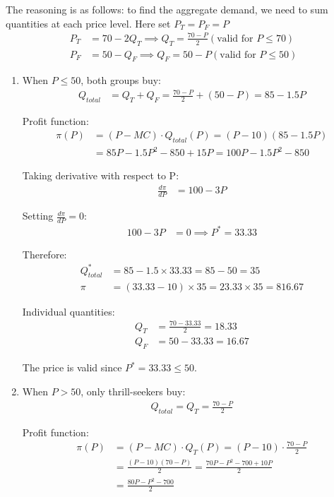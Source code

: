 \documentclass[12pt]{article}
\begin{document}
\begin{enumerate}[label=(\alph*)]
The reasoning is as follows: to find the aggregate demand, we need to sum quantities at each price level. Here set $P_T = P_F = P$
\begin{align*}
P_T &= 70 - 2Q_T \implies Q_T = \frac{70 - P}{2} (\text{valid for } P \leq 70)\\
P_F &= 50 - Q_F \implies Q_F = 50 - P (\text{valid for } P \leq 50)
\end{align*}

\begin{enumerate} [label= (\roman*)]

\item When $P \leq 50$, both groups buy:
\begin{align*}
Q_{total} &= Q_T + Q_F = \frac{70 - P}{2} + (50 - P) = 85 - 1.5P
\end{align*}

Profit function:
\begin{align*}
\pi(P) &= (P - MC) \cdot Q_{total}(P) = (P - 10)(85 - 1.5P) \\
&= 85P - 1.5P^2 - 850 + 15P = 100P - 1.5P^2 - 850
\end{align*}

Taking derivative with respect to P:
\begin{align*}
\frac{d\pi}{dP} &= 100 - 3P
\end{align*}

Setting $\frac{d\pi}{dP} = 0$:
\begin{align*}
100 - 3P &= 0 \implies P^* = 33.33
\end{align*}

Therefore:
\begin{align*}
Q_{total}^* &= 85 - 1.5 \times 33.33 = 85 - 50 = 35 \\
\pi &= (33.33 - 10) \times 35 = 23.33 \times 35 = 816.67
\end{align*}

Individual quantities:
\begin{align*}
Q_T &= \frac{70 - 33.33}{2} = 18.33 \\
Q_F &= 50 - 33.33 = 16.67
\end{align*}

The price is valid since $P^* = 33.33 \leq 50$.

\item When $P > 50$, only thrill-seekers buy:
\begin{align*}
Q_{total} = Q_T = \frac{70 - P}{2}
\end{align*}

Profit function:
\begin{align*}
\pi(P) &= (P - MC) \cdot Q_T(P) = (P - 10) \cdot \frac{70 - P}{2} \\
&= \frac{(P - 10)(70 - P)}{2} = \frac{70P - P^2 - 700 + 10P}{2} \\
&= \frac{80P - P^2 - 700}{2}
\end{align*}


\end{enumerate}
\end{enumerate}
\end{document}
